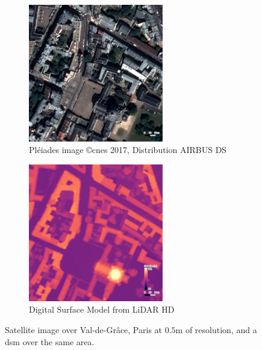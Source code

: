 \begin{figure}
    \centering
    \begin{subfigure}[t]{0.5\linewidth}
        \centering
        \includegraphics[height=6cm]{Images/0_Intro/Paris_Ortho.png}
        \caption{Pléiades image \copyright \acrshort{cnes} 2017, Distribution AIRBUS DS}
        \label{fig:VDG_ortho}
    \end{subfigure}\hfill
    \begin{subfigure}[t]{0.5\linewidth}
        \centering
        \includegraphics[height=6cm]{Images/0_Intro/Paris_DSM.png}
        \caption{Digital Surface Model from LiDAR HD}
        \label{fig:VDG_dsm}
    \end{subfigure}
    \caption{Satellite image over Val-de-Grâce, Paris at $0.5$m of resolution, and a \acrshort{dsm} over the same area.}
    \label{fig:intro_dsm_example}
\end{figure}

